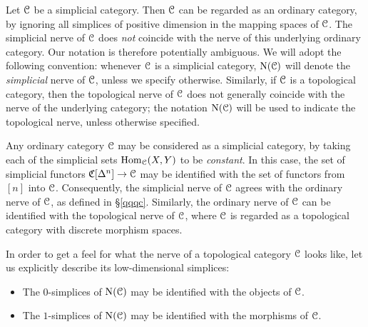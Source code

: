 \begin{1.1.5 inf-cats vs simplicial cats}
\begin{warning}
Let $\operatorname{\mathcal{C}}$ be a simplicial category. Then $\operatorname{\mathcal{C}}$ can be regarded as an ordinary category, by ignoring all simplices of positive dimension in the mapping spaces of $\operatorname{\mathcal{C}}$. The simplicial nerve of $\operatorname{\mathcal{C}}$ does {\em not} coincide with the nerve of this underlying ordinary category. Our notation is therefore potentially ambiguous. We will adopt the following convention: whenever $\operatorname{\mathcal{C}}$ is a simplicial category, $\operatorname{N}(\operatorname{\mathcal{C}})$ will denote the {\em simplicial} nerve of $\operatorname{\mathcal{C}}$, unless we specify otherwise. Similarly, if $\operatorname{\mathcal{C}}$ is a topological category, then the topological nerve
of $\operatorname{\mathcal{C}}$ does not generally coincide with the nerve of the underlying category; the notation
$\operatorname{N}(\operatorname{\mathcal{C}})$ will be used to indicate the topological nerve, unless otherwise specified.
\end{warning}

\begin{example}
Any ordinary category $\operatorname{\mathcal{C}}$ may be considered as a simplicial
category, by taking each of the simplicial sets
$\operatorname{Hom}_{\operatorname{\mathcal{C}}}(X,Y)$ to be {\em constant}. In this case, the set of
simplicial functors $\operatorname{\mathfrak{C}}[\Delta^n] \rightarrow \operatorname{\mathcal{C}}$ may be
identified with the set of functors from $[n]$ into $\operatorname{\mathcal{C}}$.
Consequently, the simplicial nerve of $\operatorname{\mathcal{C}}$ agrees with the ordinary nerve of $\operatorname{\mathcal{C}}$, as defined in \S \ref{qqqc}. Similarly, the ordinary nerve of $\operatorname{\mathcal{C}}$ can be identified with the topological nerve of $\operatorname{\mathcal{C}}$, where $\operatorname{\mathcal{C}}$ is regarded as a topological category with discrete morphism spaces.
\end{example}

In order to get a feel for what the nerve of a topological
category $\operatorname{\mathcal{C}}$ looks like, let us explicitly describe its
low-dimensional simplices:

\begin{itemize}
\item The $0$-simplices of $\operatorname{N}(\operatorname{\mathcal{C}})$ may be identified with
the objects of $\operatorname{\mathcal{C}}$.

\item The $1$-simplices of $\operatorname{N}(\operatorname{\mathcal{C}})$ may be identified with
the morphisms of $\operatorname{\mathcal{C}}$.


\end{itemize}
\end{1.1.5 inf-cats vs simplicial cats}
